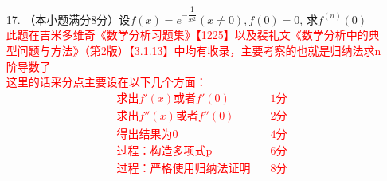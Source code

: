 \documentclass[a4paper,12pt]{article}
\begin{document}
\begin{enumerate}
    \item[17.]（本小题满分8分）设$f(x)=e^{-\dfrac{1}{x^2}}(x\neq0),f(0)=0$, 求$f^{(n)}(0)$ \\
    \textcolor{red}{
    此题在吉米多维奇《数学分析习题集》【1225】以及裴礼文《数学分析中的典型问题与方法》（第2版）【3.1.13】中均有收录，主要考察的也就是归纳法求n阶导数了\\
    这里的话采分点主要设在以下几个方面：\\
    \begin{align*}
        & \text{求出} f'(x)\text{或者} f'(0)  & \text{1分} \\
        & \text{求出} f''(x)\text{或者} f''(0)  & \text{2分} \\
        & \text{得出结果为0} \quad & \text{4分} \\
        & \text{过程：构造多项式p} \quad & \text{6分} \\
        & \text{过程：严格使用归纳法证明} \quad & \text{8分} \\
        \end{align*}
    }


\end{enumerate}
\end{document}
